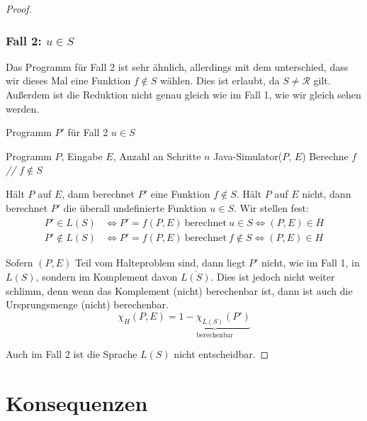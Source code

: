\documentclass[journal]{IEEEtran}
\begin{document}
\begin{proof}
\subsubsection{Fall 2: $u \in S$}

Das Programm für Fall 2 ist sehr ähnlich, allerdings mit dem unterschied, dass wir dieses Mal eine Funktion $f \notin S$ wählen. Dies ist erlaubt, da $S \ne \mathcal{R}$ gilt. Außerdem ist die Reduktion nicht genau gleich wie im Fall 1, wie wir gleich sehen werden.

\begin{algorithm}
\caption{Programm $P'$ für Fall 2 $u \in S$}
\begin{algorithmic}[1]
\renewcommand{\algorithmicrequire}{\textbf{Input:}}
\renewcommand{\algorithmicensure}{\textbf{Output:}}
\REQUIRE Programm $P$, Eingabe $E$, Anzahl an Schritte $n$
\STATE Java-Simulator($P$, $E$)
\STATE Berechne $f$ \textit{// $f \notin S$}
\end{algorithmic}
\end{algorithm}

Hält $P$ auf $E$, dann berechnet $P'$ eine Funktion $f \notin S$. Hält $P$ auf $E$ nicht, dann berechnet $P'$ die überall undefinierte Funktion $u \in S$. Wir stellen fest:
\begin{align*}
P' \in L(S) &\Leftrightarrow P' = f(P, E) \ \text{berechnet} \ u \in S \Leftrightarrow (P, E) \in \overline{H} \\
P' \notin L(S) &\Leftrightarrow P' = f(P, E) \ \text{berechnet} \ f \notin S \Leftrightarrow (P, E) \in H
\end{align*}

Sofern $(P, E)$ Teil vom Halteproblem sind, dann liegt $P'$ nicht, wie im Fall 1, in $L(S)$, sondern im Komplement davon $\overline{L(S)}$. Dies ist jedoch nicht weiter schlimm, denn wenn das Komplement (nicht) berechenbar ist, dann ist auch die Ursprungsmenge (nicht) berechenbar.
\begin{equation*}
\chi_{H}(P, E) = \underbrace{1 - \chi_{L(S)}(P')}_{\text{berechenbar}}
\end{equation*}

Auch im Fall 2 ist die Sprache $L(S)$ nicht entscheidbar.

\end{proof}

\section{Konsequenzen}
\label{konsequenzen}
\end{document}
